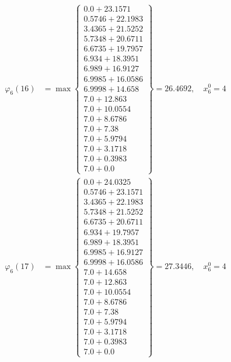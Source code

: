 \documentclass{article}
\begin{document}
\begin{align*}
\varphi_{6}(16) &= \max \left\{ \begin{array}{c}
0.0 + 23.1571 \\
 0.5746 + 22.1983 \\
 3.4365 + 21.5252 \\
 5.7348 + 20.6711 \\
 6.6735 + 19.7957 \\
 6.934 + 18.3951 \\
 6.989 + 16.9127 \\
 6.9985 + 16.0586 \\
 6.9998 + 14.658 \\
 7.0 + 12.863 \\
 7.0 + 10.0554 \\
 7.0 + 8.6786 \\
 7.0 + 7.38 \\
 7.0 + 5.9794 \\
 7.0 + 3.1718 \\
 7.0 + 0.3983 \\
 7.0 + 0.0
\end{array} \right\}=26.4692, \quad x_{6}^0=4\\
  
\varphi_{6}(17) &= \max \left\{ \begin{array}{c}
0.0 + 24.0325 \\
 0.5746 + 23.1571 \\
 3.4365 + 22.1983 \\
 5.7348 + 21.5252 \\
 6.6735 + 20.6711 \\
 6.934 + 19.7957 \\
 6.989 + 18.3951 \\
 6.9985 + 16.9127 \\
 6.9998 + 16.0586 \\
 7.0 + 14.658 \\
 7.0 + 12.863 \\
 7.0 + 10.0554 \\
 7.0 + 8.6786 \\
 7.0 + 7.38 \\
 7.0 + 5.9794 \\
 7.0 + 3.1718 \\
 7.0 + 0.3983 \\
 7.0 + 0.0
\end{array} \right\}=27.3446, \quad x_{6}^0=4\\
  

\end{align*}
\end{document}
